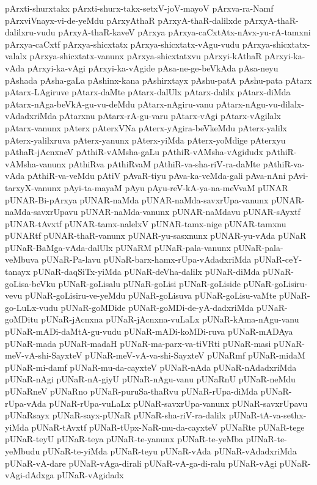 {pArxti-shurxtakx
pArxti-shurx-takx-setxV-joV-mayoV
pArxva-ra-Namf
pArxviVnayx-vi-de-yeMdu
pArxyAthaR
pArxyA-thaR-dalilxde
pArxyA-thaR-dalilxru-vudu
pArxyA-thaR-kaveV
pArxya
pArxya-caCxtAtx-nAvx-yu-rA-tamxni
pArxya-caCxtf
pArxya-shicxtatx
pArxya-shicxtatx-vAgu-vudu
pArxya-shicxtatx-valalx
pArxya-shicxtatx-vanunx
pArxya-shicxtatxvu
pArxyi-kAthaR
pArxyi-ka-vAda
pArxyi-ka-vAgi
pArxyi-ka-vAgide
pAsa-ne-ge-beVkAda
pAsa-neyu
pAshada
pAsha-gaLa
pAshinx-kana
pAshirxtayx
pAshu-patA
pAshu-pata
pAtarx
pAtarx-LAgiruve
pAtarx-daMte
pAtarx-dalUlx
pAtarx-dalilx
pAtarx-diMda
pAtarx-nAga-beVkA-gu-vu-deMdu
pAtarx-nAgiru-vanu
pAtarx-nAgu-vu-dilalx-vAdadxriMda
pAtarxnu
pAtarx-rA-gu-varu
pAtarx-vAgi
pAtarx-vAgilalx
pAtarx-vanunx
pAterx
pAterxVNa
pAterx-yAgira-beVkeMdu
pAterx-yalilx
pAterx-yalilxruva
pAterx-yanunx
pAterx-yiMda
pAterx-yoMdige
pAterxyu
pAthaR-jAcnxneV
pAthiR-vAMsha-gaLu
pAthiR-vAMsha-vAgidudx
pAthiR-vAMsha-vanunx
pAthiRva
pAthiRvaM
pAthiR-va-sha-riV-ra-daMte
pAthiR-va-vAda
pAthiR-va-veMdu
pAtiV
pAvaR-tiyu
pAva-ka-veMda-gali
pAva-nAni
pAvi-tarxyX-vanunx
pAyi-ta-mayaM
pAyu
pAyu-reV-kA-ya-na-meVvaM
pUNAR
pUNAR-Bi-pArxya
pUNAR-naMda
pUNAR-naMda-savxrUpa-vanunx
pUNAR-naMda-savxrUpavu
pUNAR-naMda-vanunx
pUNAR-naMdavu
pUNAR-sAyxtf
pUNAR-tAvxtf
pUNAR-tamx-nalelxV
pUNAR-tamx-nige
pUNAR-tamxnu
pUNARtf
pUNAR-thaR-vanunx
pUNAR-yu-sasxnunx
pUNAR-yu-vAda
pUNaR
pUNaR-BaMga-vAda-dalUlx
pUNaRM
pUNaR-pala-vanunx
pUNaR-pala-veMbuva
pUNaR-Pa-lavu
pUNaR-barx-hamx-rUpa-vAdadxriMda
pUNaR-ceY-tanayx
pUNaR-daqSiTx-yiMda
pUNaR-deVha-dalilx
pUNaR-diMda
pUNaR-goLisa-beVku
pUNaR-goLisalu
pUNaR-goLisi
pUNaR-goLiside
pUNaR-goLisiru-vevu
pUNaR-goLisiru-ve-yeMdu
pUNaR-goLisuva
pUNaR-goLisu-vaMte
pUNaR-go-LuLx-vudu
pUNaR-goMDide
pUNaR-goMDi-de-yA-dadxriMda
pUNaR-goMDitu
pUNaR-jAcnxna
pUNaR-jAcnxna-vuLaLx
pUNaR-kAma-nAgu-vanu
pUNaR-mADi-daMtA-gu-vudu
pUNaR-mADi-koMDi-ruva
pUNaR-mADAya
pUNaR-mada
pUNaR-madaH
pUNaR-ma-parx-va-tiVRti
pUNaR-masi
pUNaR-meV-vA-shi-SayxteV
pUNaR-meV-vA-va-shi-SayxteV
pUNaRmf
pUNaR-midaM
pUNaR-mi-damf
pUNaR-mu-da-cayxteV
pUNaR-nAda
pUNaR-nAdadxriMda
pUNaR-nAgi
pUNaR-nA-giyU
pUNaR-nAgu-vanu
pUNaRnU
pUNaR-neMdu
pUNaRneV
pUNaRno
pUNaR-puruSa-thaRvu
pUNaR-rUpa-diMda
pUNaR-rUpa-vAda
pUNaR-rUpa-vuLaLx
pUNaR-savxrUpa-vanunx
pUNaR-savxrUpavu
pUNaRsayx
pUNaR-sayx-pUNaR
pUNaR-sha-riV-ra-dalilx
pUNaR-tA-va-sethx-yiMda
pUNaR-tAvxtf
pUNaR-tUpx-NaR-mu-da-cayxteV
pUNaRte
pUNaR-tege
pUNaR-teyU
pUNaR-teya
pUNaR-te-yanunx
pUNaR-te-yeMba
pUNaR-te-yeMbudu
pUNaR-te-yiMda
pUNaR-teyu
pUNaR-vAda
pUNaR-vAdadxriMda
pUNaR-vA-dare
pUNaR-vAga-dirali
pUNaR-vA-ga-di-ralu
pUNaR-vAgi
pUNaR-vAgi-dAdxga
pUNaR-vAgidadx
}
